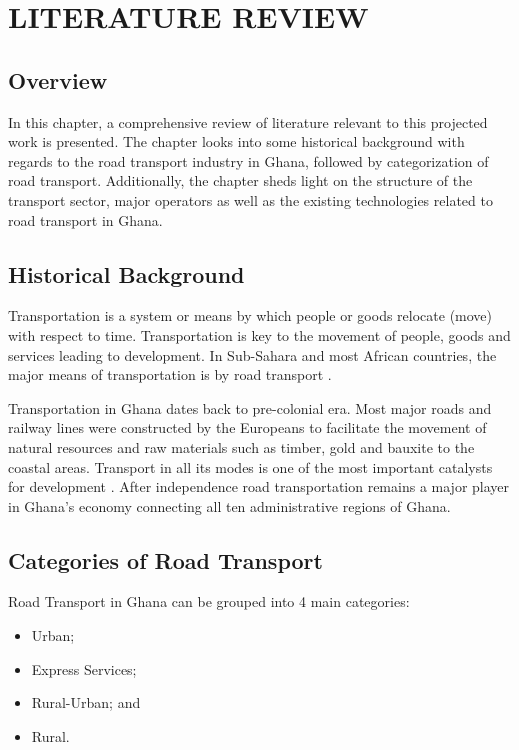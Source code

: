 
\chapter{LITERATURE REVIEW} %
\section{Overview}
In this chapter, a comprehensive review of literature relevant to this projected work is presented. The chapter looks into some historical background with regards to the road transport industry in Ghana, followed by categorization of road transport. Additionally, the chapter sheds light on the structure of the transport sector, major operators as well as the existing technologies related to road transport in Ghana.



\section{Historical Background}
Transportation is a system or means by which people or goods relocate (move) with respect to time. Transportation is key to the movement of people, goods and services leading to development. In Sub-Sahara and most African countries, the major means of transportation is by road transport \citep{riverson1991intermediate}.

Transportation in Ghana dates back to pre-colonial era. Most major roads and railway lines were constructed by the Europeans to facilitate the movement of natural resources and raw materials such as timber, gold and bauxite to the coastal areas. Transport in all its modes is one of the most important catalysts for development \citep{dickson1961development}.
After independence road transportation remains a major player in Ghana's economy connecting all ten administrative regions of Ghana. 

\section{Categories of Road Transport}
Road Transport in Ghana can be grouped into 4 main categories:
\begin{itemize}
	\item Urban;
	\item Express Services;
	\item Rural-Urban; and
	\item Rural.
\end{itemize}

